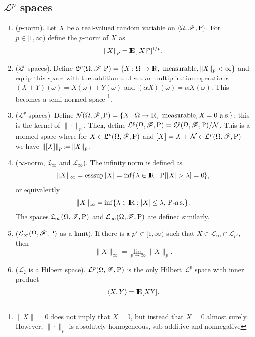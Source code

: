 \documentclass[a4paper,10pt]{scrbook}
\begin{document}
\subsection{$\mathcal{L}^p$ spaces}
\begin{enumerate}
 \item ($p$-norm). Let $X$ be a real-valued random variable on $(\Omega,\mathscr{F},\mathrm{P})$. For $p\in[1,\infty)$ define the $p$-norm of $X$ as 
       \[
        \|X\|_p = \E[|X|^p]^{1/p}.
       \]
 \item ($\mathfrak{L}^p$ spaces). Define $\mathfrak{L}^p\ofp=\{X:\Omega\to\Re,\text{ measurable}, 
       \|X\|_p<\infty\}$ and equip this space with the addition and scalar multiplication 
       operations $(X+Y)(\omega) = X(\omega) + Y(\omega)$ and $(\alpha X)(\omega) = \alpha X(\omega)$.
       This becomes a semi-normed space%
	  \footnote{$\|X\|=0$ does not imply that $X=0$, but instead 
		    that $X=0$ almost surely. However, $\|\cdot\|_p$ is absolutely 
		    homogeneous, sub-additive and nonnegative}.%
 \item ($\mathcal{L}^p$ spaces). Define $\mathcal{N}\ofp = \{X:\Omega\to\Re,
       \text{ measurable}, X=0 \text{ a.s.}\}$; this is the kernel of $\|\cdot\|_p$. 
       Then, define $\mathcal{L}^p(\Omega,\mathscr{F},\mathrm{P}) = \mathfrak{L}^p(\Omega,\mathscr{F},\mathrm{P}) / \mathcal{N}$.
       This is a normed space where for $X\in\mathfrak{L}^p(\Omega,\mathscr{F},\mathrm{P})$ and $[X]=X+\mathcal{N}\in\mathcal{L}^p(\Omega,\mathscr{F},\mathrm{P})$
       we have $\|[X]\|_p {}\mathop{\mathrel{:}=}{} \|X\|_p$.
 \item ($\infty$-norm, $\mathfrak{L}_\infty$ and $\mathcal{L}_\infty$). The infinity norm is defined as 
	\[
	 \|X\|_\infty = \esssup |X| = \inf\{\lambda \in \Re: \prob[|X|> \lambda] = 0\},
	\]
	or equivalently 
	\[
	 \|X\|_\infty = \inf \{\lambda \in \Re: |X|\leq \lambda,\, \prob\text{-a.s.}\}.
	\]
	The spaces $\mathfrak{L}_\infty(\Omega,\mathscr{F},\mathrm{P})$ and $\mathcal{L}_\infty(\Omega,\mathscr{F},\mathrm{P})$ are defined 
	similarly.
 \item ($\mathcal{L}_\infty(\Omega,\mathscr{F},\mathrm{P})$ as a limit). If there is a $p'\in [1,\infty)$ such 
       that $X\in\mathcal{L}_\infty\cap \mathcal{L}_{p'}$, then
       \[
        \|X\|_\infty = \lim_{p\to\infty}\|X\|_p.
       \]

 \item ($\mathcal{L}_2$ is a Hilbert space). $\mathcal{L}^p(\Omega,\mathscr{F},\mathrm{P})$ is the only Hilbert 
       $\mathcal{L}^p$ space with inner product
       \[
        \<X,Y\> = \E[XY].
       \]


\end{enumerate}
\end{document}
